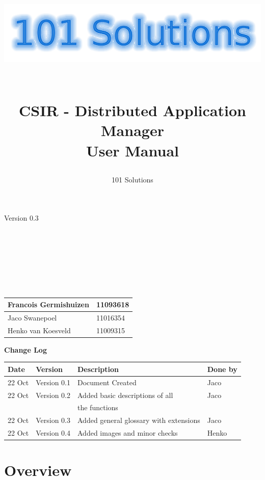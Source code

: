 \documentclass[a4paper,12pt,final]{article}
\title{
\begin{center}
  	\includegraphics[scale=0.3]{101Logo.png} 
  \end{center}
  \textbf{\\}
CSIR - Distributed Application Manager\\
User Manual\\
}
\author{101 Solutions}
\begin{document}
\maketitle
\begin{center}
Version 0.3
\end{center}
\textbf{\\}
\textbf{\\}
\textbf{\\}
\textbf{\\}
\textbf{\\}
\textbf{\\}
\begin{center}
\begin{tabular}{|l|l|}
\hline
Francois Germishuizen & 11093618\\
\hline
Jaco Swanepoel & 11016354\\
\hline
Henko van Koesveld & 11009315\\
\hline
\end{tabular}
\end{center}
\thispagestyle{empty}
\newpage
\thispagestyle{empty}
\textbf{\large{Change Log}}
\vspace{6pt}\newline
\begin{tabular}{|l|l|l|l|}
\hline
\textbf{Date} & \textbf{Version} & \textbf{Description} & \textbf{Done by}\\
\hline
22 Oct & Version 0.1 & Document Created & Jaco\\
\hline
22 Oct & Version 0.2 & Added basic descriptions of all  & Jaco\\
&&the functions&\\
\hline
22 Oct & Version 0.3 & Added general glossary with extensions & Jaco\\
\hline
22 Oct & Version 0.4 & Added images and minor checks  & Henko\\
\hline
\end{tabular}
\newpage
\tableofcontents
\thispagestyle{empty}
\newpage

\section{Overview}
\end{document}
